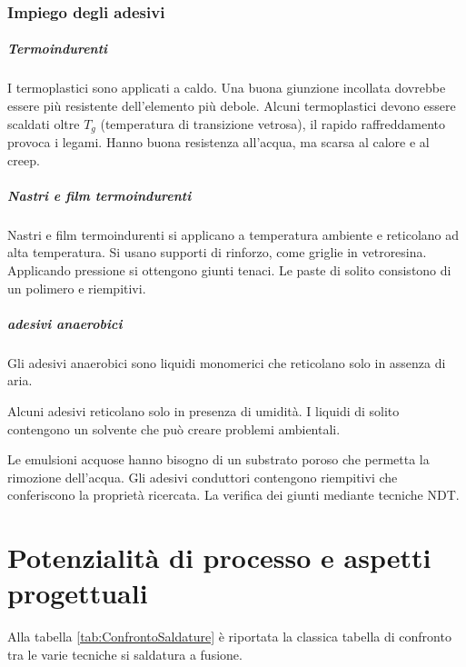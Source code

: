 \subsection{Impiego degli adesivi}
\paragraph{Termoindurenti}
I termoplastici sono applicati a caldo.
Una buona giunzione incollata dovrebbe essere più resistente dell'elemento più debole.
Alcuni termoplastici devono essere scaldati oltre $T_g$ (temperatura di transizione vetrosa), il rapido raffreddamento provoca i legami.
Hanno buona resistenza all'acqua, ma scarsa al calore e al creep.

\paragraph{Nastri e film termoindurenti}
Nastri e film termoindurenti si applicano a temperatura ambiente e reticolano ad alta temperatura.
Si usano supporti di rinforzo, come griglie in vetroresina.
Applicando pressione si ottengono giunti tenaci.
Le paste di solito consistono di un polimero e riempitivi.

\paragraph{adesivi anaerobici}
Gli adesivi anaerobici sono liquidi monomerici che reticolano solo in assenza di aria.

Alcuni adesivi reticolano solo in presenza di umidità. I liquidi di solito contengono un solvente che può creare problemi ambientali.

Le emulsioni acquose hanno bisogno di un substrato poroso che permetta la rimozione dell'acqua.
Gli adesivi conduttori contengono riempitivi che conferiscono la proprietà ricercata.
La verifica dei giunti mediante tecniche \ac{NDT}.

\begin{figure}
\centering
{}\quad
{}
\end{figure}


\chapter{Potenzialità di processo e aspetti progettuali}
Alla tabella \ref{tab:ConfrontoSaldature} è riportata la classica tabella di confronto tra le varie tecniche si saldatura a fusione.

